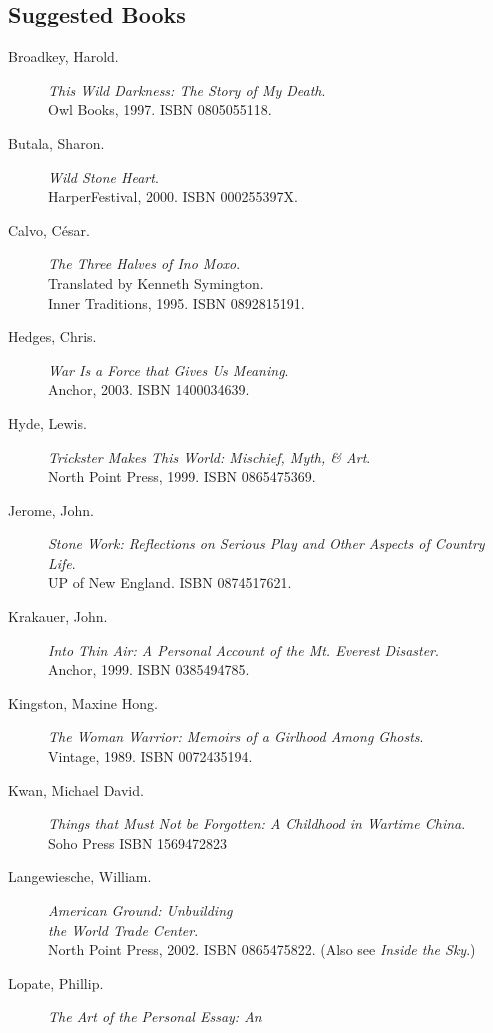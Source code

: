 \documentclass[letterpaper,10pt,headsepline]{scrreprt}
\begin{document}
\subsection{Suggested Books}
\begin{description}
\item [Broadkey, Harold.] \textit{This Wild Darkness: The Story of My
    Death}. \\Owl Books, 1997. \textsc{ISBN 0805055118}.
\item [Butala, Sharon.] \textit{Wild Stone Heart}. \\HarperFestival,
  2000. \textsc{ISBN 000255397X}.
\item [Calvo, C\'esar.] \textit{The Three Halves of Ino Moxo}.
  \\Translated by Kenneth Symington. \\Inner Traditions, 1995.
  \textsc{ISBN 0892815191}.
\item [Hedges, Chris.] \textit{War Is a Force that Gives Us Meaning}.
  \\Anchor, 2003. \textsc{ISBN 1400034639}.
\item [Hyde, Lewis.] \textit{Trickster Makes This World: Mischief,
    Myth, \& Art}. \\North Point Press, 1999. \textsc{ISBN
    0865475369}.
\item [Jerome, John.] \textit{Stone Work: Reflections on Serious Play
    and Other Aspects of Country Life}. \\UP of New England.
  \textsc{ISBN 0874517621}.
\item [Krakauer, John.] \textit{Into Thin Air: A Personal Account of
    the Mt. Everest Disaster}. \\Anchor, 1999. \textsc{ISBN
    0385494785}.
\item [Kingston, Maxine Hong.] \textit{The Woman Warrior: Memoirs of a
    Girlhood Among Ghosts}. \\Vintage, 1989. \textsc{ISBN
    0072435194}.
\item [Kwan, Michael David.] \textit{Things that Must Not be
    Forgotten: A Childhood in Wartime China}. \\Soho Press
  \textsc{ISBN 1569472823}
\item [Langewiesche, William.] \textit{American Ground: Unbuilding
    \\the World Trade Center}. \\North Point Press, 2002.
  \textsc{ISBN 0865475822}. (Also see \textit{Inside the Sky}.)
\item [Lopate, Phillip.] \textit{The Art of the Personal Essay: An
}
\end{description}
\end{document}
